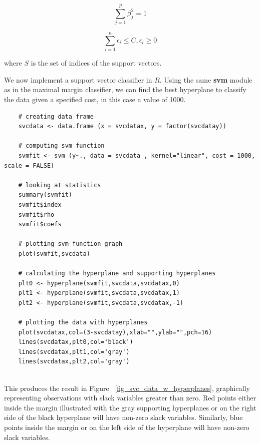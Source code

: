 \documentclass[12pt]{article}
\begin{document}
\begin{equation}
\sum_{j=1}^{p} \beta^2_j=1
\end{equation}

\begin{equation} \label{slackvariables}
\sum_{i=1}^{n} \epsilon_i \le C, \epsilon_i \ge 0
\end{equation}

where \(S\) is the set of indices of the support vectors.

We now implement a support vector classifier in $R$. Using the same \textbf{svm} module as in the maximal margin classifier, we can find the best hyperplane to classify the data given a specified cost, in this case a value of 1000.

\begin{verbatim}
    # creating data frame 
    svcdata <- data.frame (x = svcdatax, y = factor(svcdatay))
    
    # computing svm function
    svmfit <- svm (y~., data = svcdata , kernel="linear", cost = 1000, scale = FALSE)
    
    # looking at statistics
    summary(svmfit)
    svmfit$index
    svmfit$rho
    svmfit$coefs
    
    # plotting svm function graph
    plot(svmfit,svcdata)
    
    # calculating the hyperplane and supporting hyperplanes
    plt0 <- hyperplane(svmfit,svcdata,svcdatax,0)
    plt1 <- hyperplane(svmfit,svcdata,svcdatax,1)
    plt2 <- hyperplane(svmfit,svcdata,svcdatax,-1)
    
    # plotting the data with hyperplanes
    plot(svcdatax,col=(3-svcdatay),xlab="",ylab="",pch=16)
    lines(svcdatax,plt0,col='black')
    lines(svcdatax,plt1,col='gray')
    lines(svcdatax,plt2,col='gray')
    
\end{verbatim}

This produces the result in Figure ~\ref{fig_svc_data_w_hyperplanes}, graphically representing observations with slack variables greater than zero. Red points either inside the margin illustrated with the gray supporting hyperplanes or on the right side of the black hyperplane will have non-zero slack variables. Similarly, blue points inside the margin or on the left side of the hyperplane will have non-zero slack variables.
\end{document}
